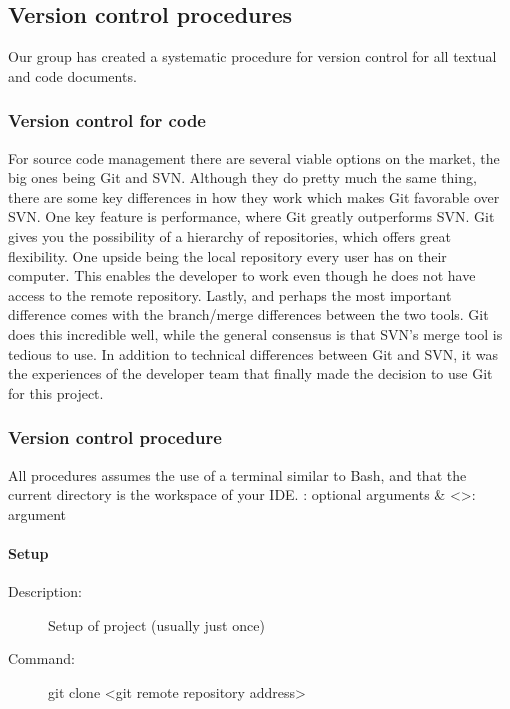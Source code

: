

\subsection{Version control procedures}
Our group has created a systematic procedure for version control for all textual  and code documents. 

\subsubsection{Version control for code}
For source code management there are several viable options on the market, the big ones being Git and SVN. Although they do pretty much the same thing, there are some key differences in how they work which makes Git favorable over SVN. One key feature is performance, where Git greatly outperforms SVN. Git gives you the possibility of a hierarchy of repositories, which offers great flexibility. One upside being the local repository every user has on their computer. This enables the developer to work even though he does not have access to the remote repository. Lastly, and perhaps the most important difference comes with the branch/merge differences between the two tools. Git does this incredible well, while the general consensus is that SVN’s merge tool is tedious to use.  
\newline
\newline
In addition to technical differences between Git and SVN, it was the experiences of the developer team that finally made the decision to use Git for this project.

\subsubsection{Version control procedure}
All procedures assumes the use of a terminal similar to Bash, and that the current directory is the workspace of your IDE.
\newline
\newline
[]: optional arguments \& <>: argument

\paragraph{Setup}
\begin{description}
\item[Description:] Setup of project (usually just once)
\item[Command:] git clone <git remote repository address>
\end{description}

